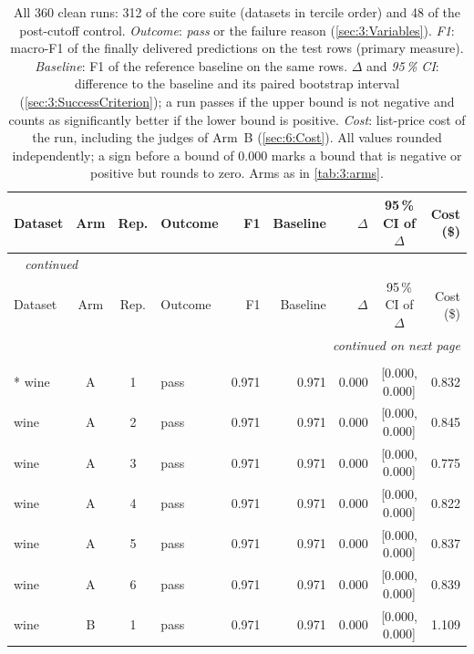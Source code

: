 {\footnotesize
\setlength{\tabcolsep}{4.5pt}
\begin{longtable}{lccl rrrcr}
\caption[All clean runs]{All 360 clean runs: 312 of the core suite (datasets in tercile order) and 48 of the post-cutoff control. \emph{Outcome}: \emph{pass} or the failure reason (\autoref{sec:3:Variables}). \emph{F1}: macro-F1 of the finally delivered predictions on the test rows (primary measure). \emph{Baseline}: F1 of the reference baseline on the same rows. $\Delta$ and \emph{95\,\% CI}: difference to the baseline and its paired bootstrap interval (\autoref{sec:3:SuccessCriterion}); a run passes if the upper bound is not negative and counts as significantly better if the lower bound is positive. \emph{Cost}: list-price cost of the run, including the judges of Arm~B (\autoref{sec:6:Cost}). All values rounded independently; a sign before a bound of 0.000 marks a bound that is negative or positive but rounds to zero. Arms as in \autoref{tab:3:arms}.}\label{tab:D:runs}\\
\toprule
Dataset & Arm & Rep. & Outcome & F1 & Baseline & $\Delta$ & 95\,\% CI of $\Delta$ & Cost (\$) \\
\midrule
\endfirsthead
\multicolumn{9}{l}{\emph{\tablename~\thetable{} continued}}\\
\toprule
Dataset & Arm & Rep. & Outcome & F1 & Baseline & $\Delta$ & 95\,\% CI of $\Delta$ & Cost (\$) \\
\midrule
\endhead
\midrule
\multicolumn{9}{r}{\emph{continued on next page}}\\
\endfoot
\bottomrule
\endlastfoot
\multicolumn{9}{l}{\textbf{Core suite}}\\*
\addlinespace[2pt]
wine & A & 1 & pass & 0.971 & 0.971 & 0.000 & [0.000, 0.000] & 0.832 \\
wine & A & 2 & pass & 0.971 & 0.971 & 0.000 & [0.000, 0.000] & 0.845 \\
wine & A & 3 & pass & 0.971 & 0.971 & 0.000 & [0.000, 0.000] & 0.775 \\
wine & A & 4 & pass & 0.971 & 0.971 & 0.000 & [0.000, 0.000] & 0.822 \\
wine & A & 5 & pass & 0.971 & 0.971 & 0.000 & [0.000, 0.000] & 0.837 \\
wine & A & 6 & pass & 0.971 & 0.971 & 0.000 & [0.000, 0.000] & 0.839 \\
\addlinespace[2pt]
wine & B & 1 & pass & 0.971 & 0.971 & 0.000 & [0.000, 0.000] & 1.109 \\

\end{longtable}}

